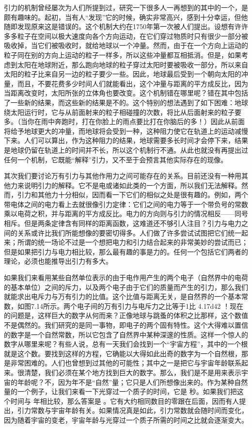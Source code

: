 引力的机制曾经屡次为人们所提到过，研究一下很多人一再想到的其中的一个，是颇有趣味的。起初，当有人“发现”它的时候，确实非常高兴，感到十分幸运，但他随即发现原来这是错误的。这个机制大约在1750年第一次被人们提出。设想有许许多多粒子在空间以极大速度向各个方向运动，在它们穿过物质时只有很少一部分被吸收掉，当它们被吸收时，就给地球以一个冲量。然而，由于在一个方向上运动的粒子同在别的方向上运动的粒子一样多，所以这些冲量都互相抵消。但是，如果考虑到太阳在地球附近，那么跑向地球的粒子穿过太阳时要被吸收一部分，所以来自太阳的粒子比来自另一边的粒子要少一些。因此，地球最后受到一个朝向太阳的冲量，而且，不要花费多少时间人们就能看出，这个冲量与距离的平方成反比，因为当距离改变时，太阳所张的立体角也要改变。这个机制错在哪里呢？错在其中包括了一些新的结果，而这些新的结果是不的。这个特别的想法遇到了如下困难：地球绕太阳运行时，它与从前面射来的粒子相碰撞的次数，将比从后面射来的粒子要多。（当你在雨中奔跑时，打在你脸上的雨点要比打在你脑后的多！）因此从前面将给予地球更大的冲量，而地球将会受到一种，这种阻力使它在轨道上的运动减慢下来。人们可以算出，作为这种阻力的结果，地球需要多长时间才会停下来，结果是地球仍留在轨道上的时间并不长，所以这个机制行不通。从此也就没有再提出过任何一个机制，它既能“解释”引力，又不至于会预言其他实际存在的现像。

其次我们要讨论万有引力与其他作用力之间可能存在的关系。目前还没有一种用其他力来说明引力的解释。它不是电或诸如此类的一个方面，所以我们无法解释。然而，引力和其他力十分相似，因而看一下它们的相似之处是很有趣的。例如，两个带电体之间的电力看上去就很像引力定律：它们之间的电力等于一个带负号的常数乘以电荷之积，并与距离的平方成反比。电力的方向则与引力的情况相反——同号相斥。但是两条定律含有同样的距离函数，这难道还不够引人注目？引力与电力之间的关系或许比我们所能想像的要密切得多。人们做了许多尝试试图把它们统一起来；所谓的统一场论不过是一个想把电力和引力结合起来的非常美妙的尝试而已；但是如果把引力与电力相比较，那么最有趣的事是力的。任何一个包括它们两者的理论，必须也能推导出引力有多大。

如果我们来看用某些自然单位表示的由于电作用产生的两个电子（自然界中的电荷的基本单位）之间的斥力，以及两个电子由于它们的质量而产生的引力，那么我们就能求出电斥力与万有引力的比值。这个比值与距离无关，是自然界的一个基本常数，如图7.14所示。两个电子间的万有引力与电斥力之比等于1比 \num{4.17d42} ！现在的问题是，这样巨大的数字从何而来？正像地球与跳蚤的体积之比那样，这个数值不是偶然的。我们研究的是同一事物，即电子的两个固有特性。这个大得难以置信的数字是一个自然常数，所以它包含了自然界中某种深邃的性质。这样一个惊人的数字从哪里来呢？有些人说，总有一天我们会找到一个“宇宙方程”，其中的一个根就是这个数。要找到这样的方程，它确能以大得如此出奇的数字为一个自然根，那是非常困难的。人们也曾想到过其他的可能性；其中之一是把它与宇宙年龄联系起来。很清楚，我们必须在某个地方找到巨大的数字。那么，我们是不是用来表示宇宙的年龄呢？不，因为年不是“自然”量；它只是人们所想像出来的。作为某种自然量的一个例子，让我们来看一下光穿过一个质子的时间，它是 秒。如果我们把这个时间与  年相比较，那么答案是 。它有大约相同数目的零跟在后面，因而有人提出，引力常数与宇宙年龄有关。如果情况真是如此，引力常数就会随时间而变化，因为随着宇宙的变老，宇宙年龄与光穿过一个质子所需的时间之比就会逐渐变大。


